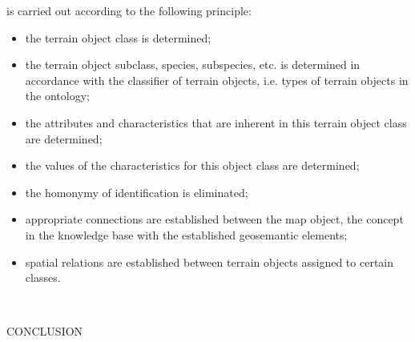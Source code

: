 \documentclass{article}
\begin{document}
\begin{multicols}{2}
is carried out according to the following principle:\\
\begin{itemize}
  \item the terrain object class is determined;
  \item the terrain object subclass, species, subspecies, etc.
is determined in accordance with the classifier of
terrain objects, i.e. types of terrain objects in the
ontology;
  \item the attributes and characteristics that are inherent in
this terrain object class are determined;
  \item the values of the characteristics for this object class
are determined;
  \item the homonymy of identification is eliminated;
 \end{itemize}	
\newpage
\begin{itemize}
  \item appropriate connections are established between the
map object, the concept in the knowledge base with
the established geosemantic elements;
  \item spatial relations are established between terrain
objects assigned to certain classes.
 \end{itemize}\\
 
\begin{center}
 CONCLUSION
 \end{center}\\
 

\end{multicols}
\end{document}
